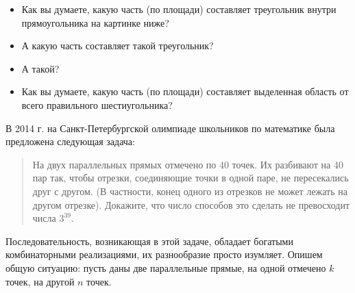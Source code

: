 
\begin{itemize}
\item Как вы думаете, какую часть (по площади) составляет треугольник внутри прямоугольника на картинке ниже?

\begin{center}  \end{center}


\item А какую часть составляет такой треугольник?

\begin{center}  \end{center}

\item А такой?

\begin{center}  \end{center}

\item Как вы думаете, какую часть (по площади) составляет выделенная область от всего правильного шестиугольника?

\begin{center}  \end{center}

\end{itemize}



В 2014 г. на Санкт-Петербургской олимпиаде школьников по математике была предложена следующая задача:
\begin{quote}
На двух параллельных прямых отмечено по 40 точек. Их разбивают на 40 пар так, чтобы отрезки, соединяющие точки в одной паре, не пересекались друг с другом. (В частности, конец одного из отрезков не может лежать на другом отрезке). Докажите, что число способов это сделать не превосходит числа $3^{39}$.
\end{quote}
Последовательность, возникающая в этой задаче, обладает богатыми комбинаторными реализациями, их разнообразие просто изумляет. Опишем общую ситуацию: пусть даны две параллельные прямые, на одной отмечено $k$ точек, на другой $n$ точек. 

